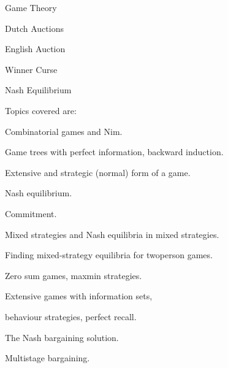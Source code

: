 
Game Theory

Dutch Auctions

English Auction

Winner Curse

Nash Equilibrium


Topics covered are:

Combinatorial games and Nim.

Game trees with perfect information, backward induction.

Extensive and strategic (normal) form of a game.

Nash equilibrium.

Commitment.

Mixed strategies and Nash equilibria in mixed strategies.

Finding mixed-strategy equilibria for twoperson games.

Zero sum games, maxmin strategies.

Extensive games with information sets,

behaviour strategies, perfect recall.

The Nash bargaining solution.

Multistage bargaining.


